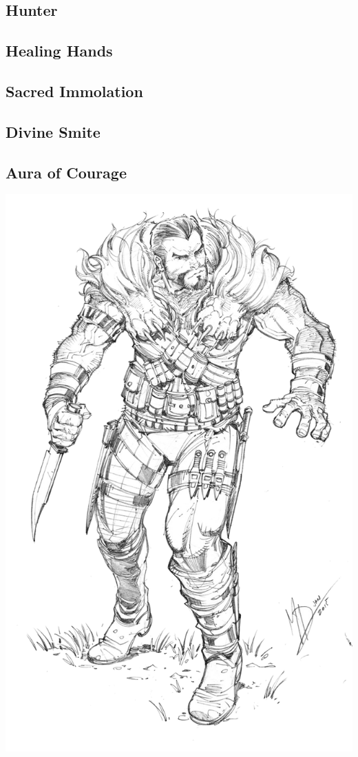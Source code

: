 
\begin{multicols*}{2}

\section{Hunter}

\subsection*{Healing Hands}

\subsection*{Sacred Immolation}

\subsection*{Divine Smite}

\subsection*{Aura of Courage}

\begin{Figure}
\centering
\includegraphics[width=\textwidth]{img/rogue.png}
\end{Figure}
    

\end{multicols*}
